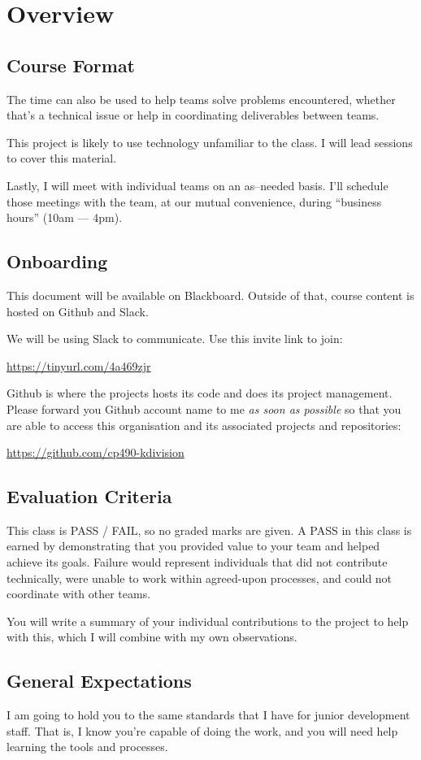 \documentclass{article}
\newcommand{\enterProblemHeader}[1]{
}
\newcommand{\exitProblemHeader}[1]{
\nobreak\extramarks{#1}{}\nobreak
}
\newcounter{homeworkProblemCounter} %
\newcommand{\homeworkProblemName}{}
\newenvironment{homeworkProblem}[1][Problem \arabic{homeworkProblemCounter}]{ %
\stepcounter{homeworkProblemCounter} %
\renewcommand{\homeworkProblemName}{#1} %
\section{\homeworkProblemName} %
\enterProblemHeader{\homeworkProblemName} %
}{
\exitProblemHeader{\homeworkProblemName} %
}
\newcommand{\homeworkSectionName}{}
\newenvironment{homeworkSection}[1]{ %
\renewcommand{\homeworkSectionName}{#1} %
\subsection{\homeworkSectionName} %
\enterProblemHeader{\homeworkProblemName\ [\homeworkSectionName]} %
}{
\enterProblemHeader{\homeworkProblemName} %
}
\begin{document}
\begin{homeworkProblem}[Overview]
\begin{homeworkSection}{Course Format}
	The time can also be used to help teams solve problems encountered, whether that's a technical issue or help in coordinating deliverables between teams.
	
	This project is likely to use technology unfamiliar to the class. I will lead sessions to cover this material.

	Lastly, I will meet with individual teams on an as--needed basis. I'll schedule those meetings with the team, at our mutual convenience, during ``business hours'' (10am --- 4pm).
\end{homeworkSection}

\begin{homeworkSection}{Onboarding}
	This document will be available on Blackboard. Outside of that, course content is hosted on Github and Slack.

	We will be using Slack to communicate. Use this invite link to join:

	\begin{center}
		\url{https://tinyurl.com/4a469zjr}
	\end{center}

	Github is where the projects hosts its code and does its project management. Please forward you Github account name to me \textit{as soon as possible} so that you are able to access this organisation and its associated projects and repositories:

	\begin{center}
		\url{https://github.com/cp490-kdivision}
	\end{center}
	
\end{homeworkSection}

\begin{homeworkSection}{Evaluation Criteria}
	This class is PASS / FAIL, so no graded marks are given. A PASS in this class is earned by demonstrating that you provided value to your team and helped achieve its goals. Failure would represent individuals that did not contribute technically, were unable to work within agreed-upon processes, and could not coordinate with other teams.
	
	You will write a summary of your individual contributions to the project to help with this, which I will combine with my own observations.
\end{homeworkSection}


\begin{homeworkSection}{General Expectations}
	I am going to hold you to the same standards that I have for junior development staff. That is, I know you're capable of doing the work, and you will need help learning the tools and processes.


\end{homeworkSection}
\end{homeworkProblem}
\end{document}
